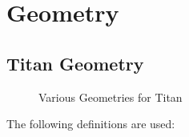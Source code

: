 \chapter{Geometry}
    \section{Titan Geometry}
        \begin{figure}[H]
        	\centering
        	\captionsetup{type=figure}
        	\begin{subfigure}[b]{0.49\textwidth}
        	    \centering
        	    \captionsetup{type=figure}
        	    \label{fig:math_titan_geom_vec}
            \end{subfigure}
            \begin{subfigure}[b]{0.49\textwidth}
                \centering
                \captionsetup{type=figure}
                \label{fig:math_geo_bending_angle}
            \end{subfigure}
            \caption{Various Geometries for Titan}
        \end{figure}
        The following definitions are used:

